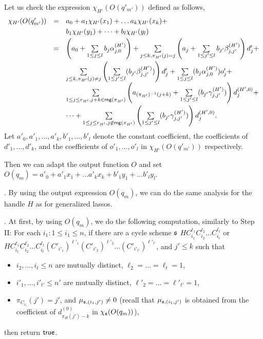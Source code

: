 Let us check the expression $\chi_{H'}(O(q'_{m'}))$ defined as follows,
\[
\begin{array}{l c l}
\smallskip
\chi_{H'}(O(q'_{m'})) & = & a_0 + a_1 \chi_{H'}(x_1) + \dots a_k \chi_{H'}(x_k) + \\
\smallskip
& & b_1 \chi_{H'}(y_1) + \dots + b_l \chi_{H'}(y_l) \\
\smallskip
&  = &  \left(a_0+\sum \limits_{1 \le j \le l} b_j \alpha^{(H')}_{j,0} \right) + \sum \limits_{j \le k, \pi_{H'}(j)=j} \left(a_j + \sum \limits_{1 \le j' \le l} b_{j'} \beta^{(H')}_{j,j'} \right) d'_j  + \\
%
& & \sum \limits_{j \le k, \pi_{H'}(j) \neq j} \left(\sum \limits_{1 \le j' \le l} (b_{j'} \beta^{(H')}_{j,j'})\right) d'_j + \sum \limits_{1\le j \le l} (b_{j} \alpha^{(H')}_{j,0}) o'_{j} + \\
\smallskip
%
& & \sum \limits_{1 \le j \le r_{H'}, j+k \in \rng(\pi_{H'})} \left(a_{(\pi_{H'})^{-1}(j+k)}+\sum \limits_{1 \le j' \le l} (b_{j'} \gamma^{(H')}_{j,j'})\right) d^{(H',0)}_j +\\ & & \dots  + \sum \limits_{1 \le j \le r_{H'}, j \not \in \rng(\pi_{H'})} \left(\sum \limits_{1 \le j' \le l} (b_{j'} \gamma^{(H')}_{j,j'})\right) d^{(H',0)}_j.
\end{array}
\] 
Let $a'_0,a'_1,\dots,a'_k,b'_1,\dots,b'_l$ denote the constant coefficient, the coefficients of $d'_1,\dots,d'_k$, and the coefficients of $o'_1,\dots,o'_l$ in $\chi_{H'}(O(q'_{m'}))$ respectively. 

Then we can adapt the output function $O$ and set $O(q_m) = a'_0 + a'_1 x_1 + \dots a'_k x_k + b'_1 y_1 + \dots b'_l y_l$.


\smallskip

. By using the output expression $O(q_m)$, we can do the same analysis for the handle $H$ as for generalized lassos.

\smallskip 
{}. At first, by using $O(q_m)$, we do the following computation, similarly to Step II: For each $i_1: 1 \le i_1 \le n$, if there are a cycle scheme ${\mathfrak{s} }$  
$HC_{i_1}^{\ell_1} C_{i_2}^{\ell_2} \dots C_{i_t}^{\ell_t}
$
or 
$HC_{i_1}^{\ell_1} C_{i_2}^{\ell_2} \dots C_{i_t}^{\ell_t} (C'_{i'_1})^{\ell'_1} (C'_{i'_2})^{\ell'_2} \dots (C'_{i'_{t'}})^{\ell'_{t'}}$,
and $j' \le k$ such that 
\begin{itemize}
\item $i_2,\dots,i_t \le n$ are mutually distinct, $\ell_2 = \dots = \ell_t = 1$, 
%
\item $i'_1,\dots,i'_{t'} \le n'$ are mutually distinct, $\ell'_2 = \dots = \ell'_{t'} = 1$, 
%
\item $\pi_{C_{i_1}}(j')=j'$, and $\mu_{{\mathfrak{s} },(i_1,j')} \neq 0$ (recall that $\mu_{{\mathfrak{s} },(i_1,j')}$ is obtained from the coefficient of $d^{(0)}_{\pi_H(j')-k}$ in  $\chi_{\mathfrak{s} }(O(q_m))$), 
\end{itemize}
then return $\mathsf{true}$. 

